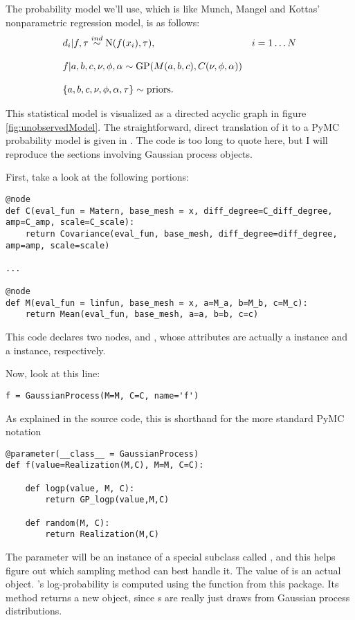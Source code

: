 \documentclass{manual}
\begin{document}
The probability model we'll use, which is like Munch, Mangel and Kottas' nonparametric regression model, is as follows:
\begin{equation}
	\label{eqn:npregression}
	\begin{array}{ll}
		d_i|f,\tau\stackrel{{\tiny ind}}{\sim} \textup N(f(x_i), \tau),&i=1\ldots N\\\\
		f|a,b,c,\nu,\phi,\alpha\sim\textup{GP}(M(a,b,c),C(\nu,\phi,\alpha))&\\\\
		\{a,b,c,\nu,\phi,\alpha,\tau\} \sim \textup{priors}.
	\end{array}
\end{equation}

This statistical model is visualized as a directed acyclic graph in figure \ref{fig:unobservedModel}. The straightforward, direct translation of it to a PyMC probability model is given in . The code is too long to quote here, but I will reproduce the sections involving Gaussian process objects. 

First, take a look at the following portions:
\begin{verbatim}
@node
def C(eval_fun = Matern, base_mesh = x, diff_degree=C_diff_degree, amp=C_amp, scale=C_scale):
    return Covariance(eval_fun, base_mesh, diff_degree=diff_degree, amp=amp, scale=scale)

...

@node
def M(eval_fun = linfun, base_mesh = x, a=M_a, b=M_b, c=M_c):
    return Mean(eval_fun, base_mesh, a=a, b=b, c=c)

\end{verbatim}
This code declares two nodes,  and , whose  attributes are actually a  instance and a  instance, respectively.  

Now, look at this line:
\begin{verbatim}
f = GaussianProcess(M=M, C=C, name='f')
\end{verbatim}
As explained in the source code, this is shorthand for the more standard PyMC notation
\begin{verbatim}
@parameter(__class__ = GaussianProcess)
def f(value=Realization(M,C), M=M, C=C):

    def logp(value, M, C):
        return GP_logp(value,M,C)

    def random(M, C):
        return Realization(M,C)
\end{verbatim}
The parameter  will be an instance of a special  subclass called , and this helps  figure out which sampling method can best handle it. The value of  is an actual  object. 's log-probability is computed using the  function from this package. Its  method returns a new  object, since s are really just draws from Gaussian process distributions.
\end{document}
